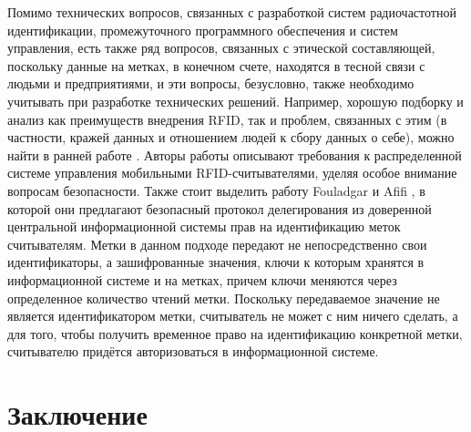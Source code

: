 Помимо технических вопросов, связанных с разработкой систем радиочастотной идентификации, промежуточного программного обеспечения и систем управления, есть также ряд вопросов, связанных с этической составляющей, поскольку данные на метках, в конечном счете, находятся в тесной связи с людьми и предприятиями, и эти вопросы, безусловно, также необходимо учитывать при разработке технических решений. Например, хорошую подборку и анализ как преимуществ внедрения RFID, так и проблем, связанных с этим (в частности, кражей данных и отношением людей к сбору данных о себе), можно найти в ранней работе \cite{Thompson2007}. Авторы работы \cite{Bashir2011} описывают требования к распределенной системе управления мобильными RFID-считывателями, уделяя особое внимание вопросам безопасности. Также стоит выделить работу Fouladgar и Afifi \cite{Fouladgar2007}, в которой они предлагают безопасный протокол делегирования из доверенной центральной информационной системы прав на идентификацию меток считывателям. Метки в данном подходе передают не непосредственно свои идентификаторы, а зашифрованные значения, ключи к которым хранятся в информационной системе и на метках, причем ключи меняются через определенное количество чтений метки. Поскольку передаваемое значение не является идентификатором метки, считыватель не может с ним ничего сделать, а для того, чтобы получить временное право на идентификацию конкретной метки, считывателю придётся авторизоваться в информационной системе.





\section{Заключение}\label{sec:ch1_conclusion}







